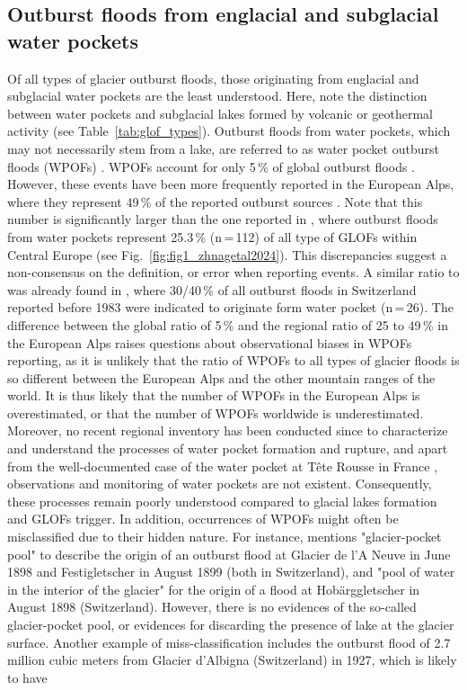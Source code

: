 \subsection{Outburst floods from englacial and subglacial water pockets} 
\label{subsection:glofs_water_pockets}

Of all types of glacier outburst floods, those originating from englacial and subglacial water pockets are the least understood. Here, note the distinction between water pockets and subglacial lakes formed by volcanic or geothermal activity (see Table~\ref{tab:glof_types}). Outburst floods from water pockets, which may not necessarily stem from a lake, are referred to as water pocket outburst floods (WPOFs) \citep[e.g. WPOFs is used in][instead of GLOFs]{Deline&al2004}. WPOFs account for only 5\,\% of global outburst floods \cite{Lutzow&al2023}. However, these events have been more frequently reported in the European Alps, where they represent 49\,\% of the reported outburst sources \citep{Lutzow&al2023}. Note that this number is significantly larger than the one reported in \cite{Zhang&al2024}, where outburst floods from water pockets represent 25.3\,\% (n\,=\,112) of all type of GLOFs within Central Europe (see Fig.~\ref{fig:fig1_zhnagetal2024}). This discrepancies suggest a non-consensus on the definition, or error when reporting events. A similar ratio to \cite{Lutzow&al2023} was already found in \cite{Haeberli1983}, where 30/40\,\% of all outburst floods in Switzerland reported before 1983 were indicated to originate form water pocket (n\,=\,26). The difference between the global ratio of 5\,\% and the regional ratio of 25 to 49\,\% in the European Alps raises questions about observational biases in WPOFs reporting, as it is unlikely that the ratio of WPOFs to all types of glacier floods is so different between the European Alps and the other mountain ranges of the world. It is thus likely that the number of WPOFs in the European Alps is overestimated, or that the number of WPOFs worldwide is underestimated. Moreover, no recent regional inventory has been conducted since \cite{Haeberli1983} to characterize and understand the processes of water pocket formation and rupture, and apart from the well-documented case of the water pocket at Tête Rousse in France \citep{Vincent&al2010b,Vincent&al2012}, observations and monitoring of water pockets are not existent. Consequently, these processes remain poorly understood compared to glacial lakes formation and GLOFs trigger. In addition, occurrences of WPOFs might often be misclassified due to their hidden nature. For instance, \cite{Rabot1905} mentions "glacier-pocket pool" to describe the origin of an outburst flood at Glacier de l'A Neuve in June 1898 and Festigletscher in August 1899 (both in Switzerland), and "pool of water in the interior of the glacier" for the origin of a flood at Hobärggletscher in August 1898 (Switzerland). However, there is no evidences of the so-called glacier-pocket pool, or evidences for discarding the presence of lake at the glacier surface. Another example of miss-classification includes the outburst flood of 2.7 million cubic meters from Glacier d'Albigna (Switzerland) in 1927, which is likely to have 